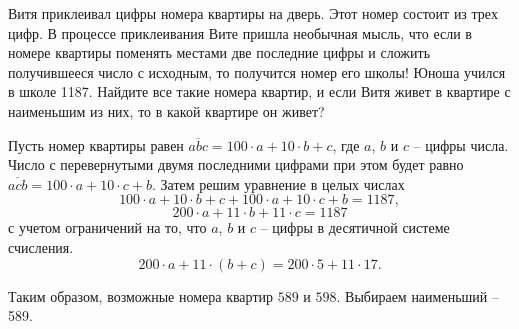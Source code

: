 
Витя приклеивал цифры номера квартиры на дверь. Этот номер состоит из трех цифр. В процессе приклеивания Вите пришла необычная мысль, что если в номере квартиры поменять местами две последние цифры и сложить получившееся число с исходным, то получится номер его школы! Юноша учился в школе 1187. Найдите все такие номера квартир, и если Витя живет в квартире с наименьшим из них, то в какой квартире он живет?

\solutionSection

Пусть номер квартиры равен $\overline{abc} = 100\cdot a + 10\cdot b + c$, где $a$, $b$ и $c$ -- цифры числа. Число с перевернутыми двумя последними цифрами при этом будет равно $\overline{acb} = 100\cdot a + 10\cdot c + b$. Затем решим уравнение в целых числах 
$$100 \cdot a + 10\cdot b + c + 100\cdot a + 10\cdot c + b = 1187,$$ 
$$200 \cdot a + 11\cdot b + 11\cdot c = 1187$$ с учетом ограничений на то, что $a$, $b$ и $c$ -- цифры в десятичной системе счисления.
$$200\cdot a + 11\cdot (b + c) = 200 \cdot 5 + 11 \cdot 17.$$

Таким образом, возможные номера квартир $589$ и $598$. Выбираем наименьший -- 589.

